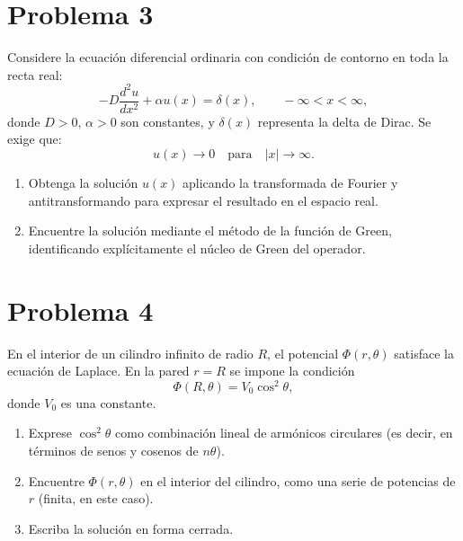 \documentclass[12pt]{article}
\begin{document}
\vspace{1cm}

\section*{Problema 3}

Considere la ecuación diferencial ordinaria con condición de contorno en toda la recta real:
\[-D\frac{d^2u}{dx^2} + \alpha u(x) = \delta(x), \qquad -\infty < x < \infty,\]
donde $D > 0$, $\alpha > 0$ son constantes, y $\delta(x)$ representa la delta de Dirac. Se exige que:
\[u(x) \to 0 \quad \text{para} \quad |x| \to \infty.\]

\begin{enumerate}
\item[(a)] Obtenga la solución $u(x)$ aplicando la transformada de Fourier y antitransformando para expresar el resultado en el espacio real.
\item[(b)] Encuentre la solución mediante el método de la función de Green, identificando explícitamente el núcleo de Green del operador.
\end{enumerate}

\vspace{1cm}

\section*{Problema 4}

En el interior de un cilindro infinito de radio $R$, el potencial $\Phi(r, \theta)$ satisface la ecuación de Laplace. En la pared $r = R$ se impone la condición
\[ \Phi(R, \theta) = V_0 \cos^2 \theta, \]
donde $V_0$ es una constante.

\begin{enumerate}
\item[(a)] Exprese $\cos^2 \theta$ como combinación lineal de armónicos circulares (es decir, en términos de senos y cosenos de $n\theta$).
\item[(b)] Encuentre $\Phi(r, \theta)$ en el interior del cilindro, como una serie de potencias de $r$ (finita, en este caso).
\item[(c)] Escriba la solución en forma cerrada.
\end{enumerate}
\end{document}
